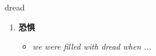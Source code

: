 
\begin{frame}
{\huge dread}
\begin{center}
\begin{enumerate}\Large
  \item \textbf{恐惧}
  \begin{itemize}
    \item \em{\Large{we were filled with dread when ...}}
  \end{itemize}
\end{enumerate}
\end{center}
\end{frame}
